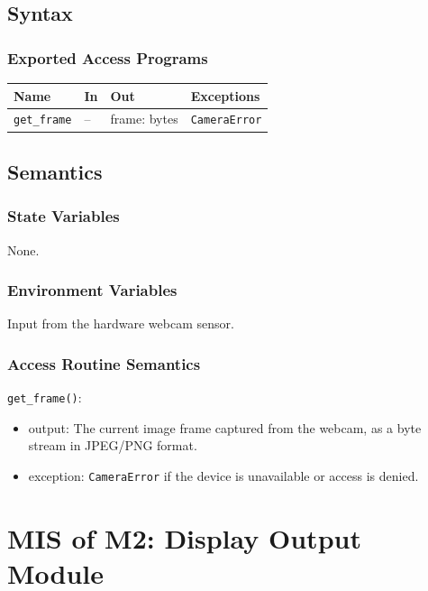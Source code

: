 \documentclass[12pt, titlepage]{article}
\begin{document}
\subsection{Syntax}

\subsubsection{Exported Access Programs}

\begin{center}
\begin{tabular}{p{3.5cm} p{4cm} p{3.5cm} p{2cm}}
\hline
\textbf{Name} & \textbf{In} & \textbf{Out} & \textbf{Exceptions} \\
\hline
\texttt{get\_frame} & -- & frame: bytes & \texttt{CameraError}\\
\hline
\end{tabular}
\end{center}

\subsection{Semantics}

\subsubsection{State Variables}
None.

\subsubsection{Environment Variables}
Input from the hardware webcam sensor.

\subsubsection{Access Routine Semantics}

\noindent \texttt{get\_frame()}:
\begin{itemize}
  \item output: The current image frame captured from the webcam, as a byte stream in JPEG/PNG format.
  \item exception: \texttt{CameraError} if the device is unavailable or access is denied.
\end{itemize}

\newpage

\section{MIS of M2: Display Output Module} \label{M2}
\end{document}
